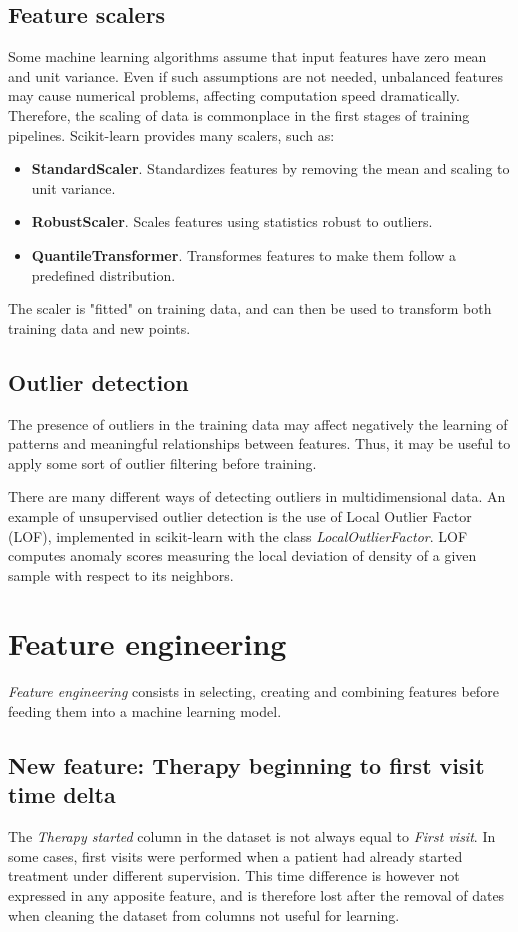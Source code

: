 \documentclass[12pt]{report}
\begin{document}
\subsection*{Feature scalers}
Some machine learning algorithms assume that input features have zero mean and unit variance. Even if such assumptions are not needed, unbalanced features may cause numerical problems, affecting computation speed dramatically. Therefore, the scaling of data is commonplace in the first stages of training pipelines. Scikit-learn provides many scalers, such as:
\begin{itemize}
\item \textbf{StandardScaler}. Standardizes features by removing the mean and scaling to unit variance.
\item \textbf{RobustScaler}. Scales features using statistics robust to outliers.
\item \textbf{QuantileTransformer}. Transformes features to make them follow a predefined distribution.
\end{itemize}
The scaler is "fitted" on training data, and can then be used to transform both training data and new points.

\subsection*{Outlier detection}
The presence of outliers in the training data may affect negatively the learning of patterns and meaningful relationships between features. Thus, it may be useful to apply some sort of outlier filtering before training.

There are many different ways of detecting outliers in multidimensional data. An example of unsupervised outlier detection is the use of Local Outlier Factor (LOF), implemented in scikit-learn with the class \textit{LocalOutlierFactor}. LOF computes anomaly scores measuring the local deviation of density of a given sample with respect to its neighbors.

\section{Feature engineering}
\textit{Feature engineering} consists in selecting, creating and combining features before feeding them into a machine learning model.

\subsection*{New feature: Therapy beginning to first visit time delta}
The \textit{Therapy started} column in the dataset is not always equal to \textit{First visit}. In some cases, first visits were performed when a patient had already started treatment under different supervision. This time difference is however not expressed in any apposite feature, and is therefore lost after the removal of dates when cleaning the dataset from columns not useful for learning.
\end{document}
